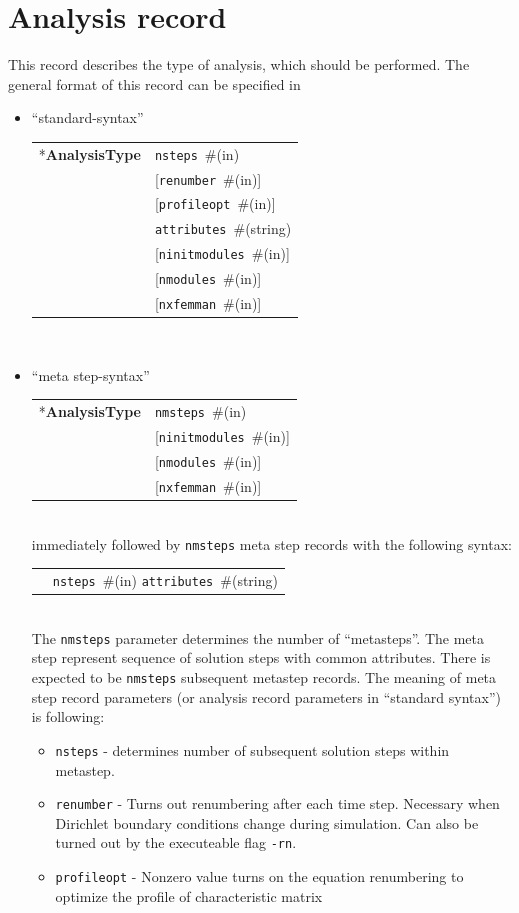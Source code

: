 \documentclass[a4paper]{article}
\makeatletter
\newcommand{\param}[1]{\texttt{#1}} %
\newcommand{\optional}[1]{[#1]} %
\newcommand{\field}[2]{\param{#1}~\#{\tiny(#2)}} %
\newcommand{\optField}[2]{\optional{\field{#1}{#2}}}
\newcommand{\entKeyword}[1]{*\textbf{#1}} %
\newenvironment{record}[1][]{\begin{tabular}{|ll}}{\end{tabular}\\}
\newcommand{\recentry}[2]{{#1}&{#2}\\}
\newcounter{rcc}
\newenvironment{record}[1][\textwidth]{\setcounter{rcc}{0}\begin{tabular*}{#1}{|ll@{\extracolsep{\fill}}r}}{\end{tabular*}\\}
\newcommand{\recentry}[2]{\ifthenelse{\value{rcc}>0}{&$\backslash$ \\}{\setcounter{rcc}{1}}{#1}&{#2}}
\makeatother
\begin{document}
\section{Analysis record}
\label{_AnalysisRecord}
This record describes the type of analysis, which should be
performed. The general format of this record can be specified in
\begin{itemize}
\item ``standard-syntax''\\
  \begin{record}[0.9\textwidth]
    \recentry{\entKeyword{AnalysisType}}{\field{nsteps}{in}}
    \recentry{}{\optField{renumber}{in}}
    \recentry{}{\optField{profileopt}{in}}
    \recentry{}{\field{attributes}{string}}
    \recentry{}{\optField{ninitmodules}{in}}
    \recentry{}{\optField{nmodules}{in}}
    \recentry{}{\optField{nxfemman}{in}}
  \end{record}
\item ``meta step-syntax''\\
  \begin{record}[0.9\textwidth]
    \recentry{\entKeyword{AnalysisType}}{\field{nmsteps}{in}}
    \recentry{}{\optField{ninitmodules}{in}}
    \recentry{}{\optField{nmodules}{in}}
    \recentry{}{\optField{nxfemman}{in}}
  \end{record}
  immediately followed by \param{nmsteps} meta step records with the following syntax:\\
  \begin{record}[0.9\textwidth]
    \recentry{}{\field{nsteps}{in} \field{attributes}{string}}
  \end{record}
  The \param{nmsteps} parameter determines the number of ``metasteps''. The
meta step represent sequence of solution steps with common attributes.
There is expected to be \param{nmsteps} subsequent metastep records.
The meaning of meta step record parameters (or analysis record
parameters in ``standard syntax'') is following:
\begin{itemize}
\item \param{nsteps} - determines number of subsequent solution steps
within me\-ta\-step.
\item \param{renumber} - Turns out renumbering after each time step.
Necessary when Dirichlet boundary conditions change during simulation.
Can also be turned out by the executeable flag \texttt{-rn}.
\item \param{profileopt} - Nonzero value turns on the
equation renumbering to optimize the profile of characteristic matrix

\end{itemize}
\end{itemize}
\end{document}
